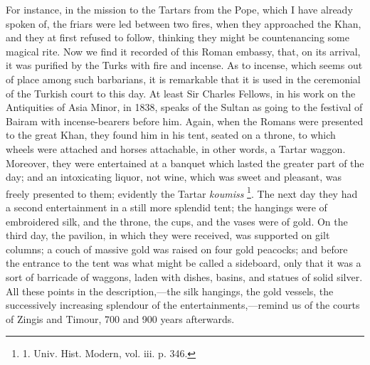 For instance, in the mission
to the Tartars from the Pope, which I have already spoken of, the
friars were led between two fires, when they approached the Khan, and
they at first refused to follow, thinking they might be countenancing
some magical rite. Now we find it recorded of this Roman embassy,
that, on its arrival, it was purified by the Turks with fire and
incense. As to incense, which seems out of place among such
barbarians, it is remarkable that it is used in the ceremonial of the
Turkish court to this day. At least Sir Charles Fellows, in his work
on the Antiquities of Asia Minor, in 1838, speaks of the Sultan as
going to the festival of Bairam with incense-bearers before him.
Again, when the Romans were presented to the great Khan, they found
him in his tent, seated on a throne, to which wheels were attached and
horses attachable, in other words, a Tartar waggon. Moreover, they
were entertained at a banquet which lasted the greater part of the
day; and an intoxicating liquor, not wine, which was sweet and
pleasant, was freely presented to them; evidently the Tartar \emph{koumiss}
\footnote{1. Univ. Hist. Modern, vol.
iii. p. 346.}. The next day they had a
second entertainment in a still more splendid tent; the hangings were
of embroidered silk, and the throne, the cups, and the vases were of
gold. On the third day, the pavilion, in which they were received, was
supported on gilt columns; a couch of massive gold was raised on four
gold peacocks; and before the entrance to the tent was what might
be called a sideboard, only that it was a sort of barricade of waggons,
laden with dishes, basins, and statues of solid silver. All these
points in the description,—the silk hangings, the gold vessels, the
successively increasing splendour of the entertainments,—remind us
of the courts of Zingis and Timour, 700 and 900 years afterwards.

